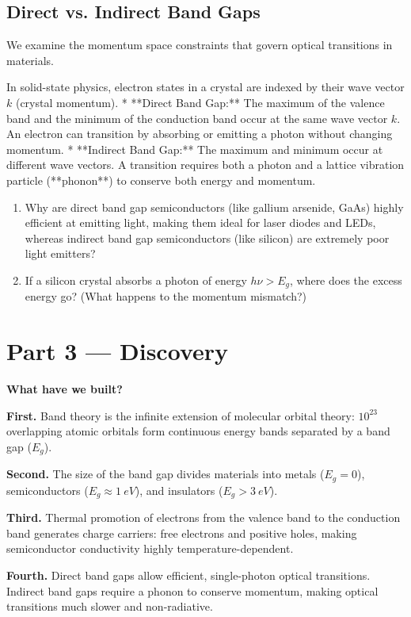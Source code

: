 \documentclass[12pt, a4paper]{book}
\begin{document}
\subsection{Direct vs. Indirect Band Gaps}

We examine the momentum space constraints that govern optical transitions in materials.

\begin{explobox}
In solid-state physics, electron states in a crystal are indexed by their wave vector $k$ (crystal momentum).
* **Direct Band Gap:** The maximum of the valence band and the minimum of the conduction band occur at the same wave vector $k$. An electron can transition by absorbing or emitting a photon without changing momentum.
* **Indirect Band Gap:** The maximum and minimum occur at different wave vectors. A transition requires both a photon and a lattice vibration particle (**phonon**) to conserve both energy and momentum.
\begin{enumerate}[label=(\alph*), leftmargin=*]
  \item Why are direct band gap semiconductors (like gallium arsenide, GaAs) highly efficient at emitting light, making them ideal for laser diodes and LEDs, whereas indirect band gap semiconductors (like silicon) are extremely poor light emitters?
  \item If a silicon crystal absorbs a photon of energy $h\nu > E_g$, where does the excess energy go? (What happens to the momentum mismatch?)
\end{enumerate}
\end{explobox}

\newpage

\section{Part 3 --- Discovery}

\begin{discoverybox}
\textbf{What have we built?}

\textbf{First.} Band theory is the infinite extension of molecular orbital theory: $10^{23}$ overlapping atomic orbitals form continuous energy bands separated by a band gap ($E_g$).

\textbf{Second.} The size of the band gap divides materials into metals ($E_g = 0$), semiconductors ($E_g \approx \SI{1}{eV}$), and insulators ($E_g > \SI{3}{eV}$).

\textbf{Third.} Thermal promotion of electrons from the valence band to the conduction band generates charge carriers: free electrons and positive holes, making semiconductor conductivity highly temperature-dependent.

\textbf{Fourth.} Direct band gaps allow efficient, single-photon optical transitions. Indirect band gaps require a phonon to conserve momentum, making optical transitions much slower and non-radiative.
\end{discoverybox}
\end{document}
